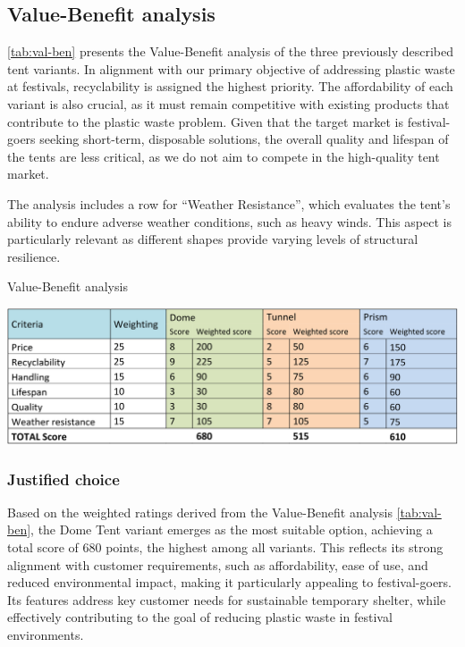 \documentclass{article}
\begin{document}
\subsection{Value-Benefit analysis}
\autoref{tab:val-ben} presents the Value-Benefit analysis of the three previously described tent variants. In
alignment with our primary objective of addressing plastic waste at festivals, recyclability is
assigned the highest priority. The affordability of each variant is also crucial, as it must remain
competitive with existing products that contribute to the plastic waste problem. Given that
the target market is festival-goers seeking short-term, disposable solutions, the overall quality
and lifespan of the tents are less critical, as we do not aim to compete in the high-quality tent
market.

The analysis includes a row for ``Weather Resistance'', which evaluates the tent's ability to
endure adverse weather conditions, such as heavy winds. This aspect is particularly relevant
as different shapes provide varying levels of structural resilience.

\begin{table}[ht!]
    \centering
    \caption{Value-Benefit analysis}
    \includegraphics[width=.85\textwidth]{media/val-ben.png}
    \label{tab:val-ben}
\end{table}

\subsubsection{Justified choice}
Based on the weighted ratings derived from the Value-Benefit analysis \autoref{tab:val-ben},
the Dome Tent variant emerges as the most suitable option, achieving a total score of 680
points, the highest among all variants. This reflects its strong alignment with customer
requirements, such as affordability, ease of use, and reduced environmental impact,
making it particularly appealing to festival-goers. Its features address key customer
needs for sustainable temporary shelter, while effectively contributing to the goal of
reducing plastic waste in festival environments.
\end{document}
